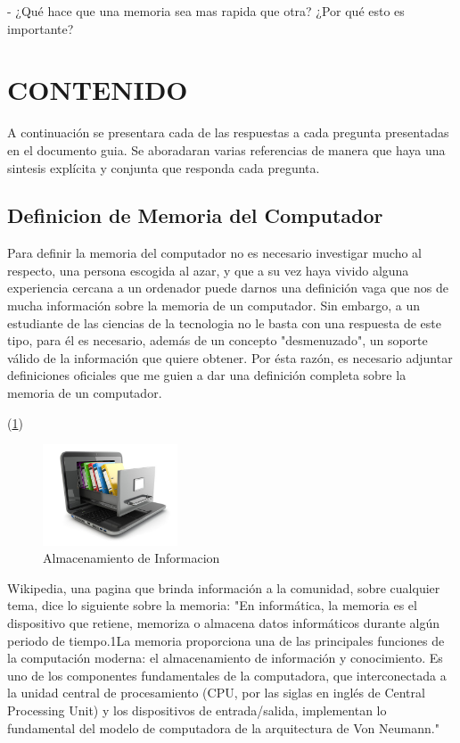 \documentclass{article}
\begin{document}
- ¿Qué hace que una memoria sea mas rapida que otra? ¿Por qué esto es importante?

\section{CONTENIDO} \label{contenido}
A continuación se presentara cada de las respuestas a cada pregunta presentadas en el documento guia.\cite{referencia}
Se aboradaran varias referencias de manera que haya una sintesis explícita y conjunta que responda cada pregunta.

\subsection{Definicion de Memoria del Computador}\label{pregunta1}
Para definir la memoria del computador no es necesario investigar mucho al respecto, una persona escogida al azar, y que a su vez haya vivido alguna experiencia cercana a un ordenador puede darnos una definición vaga que nos de mucha información sobre la memoria de un computador. Sin embargo, a un estudiante de las ciencias de la tecnologia no le basta con una respuesta de este tipo, para él es necesario, además de un concepto "desmenuzado", un soporte válido de la información que quiere obtener. Por ésta razón, es necesario adjuntar definiciones oficiales que me guien a dar una definición completa sobre la memoria de un computador.

(\ref{fig:almacenar})

\begin{figure}[h]
\includegraphics[width=4cm]{almacenar-informacion.jpg}
\centering
\caption{Almacenamiento de Informacion}
\label{fig:almacenar}
\end{figure}

Wikipedia, una pagina que brinda información a la comunidad, sobre cualquier tema, dice lo siguiente sobre la memoria:
"En informática, la memoria es el dispositivo que retiene, memoriza o almacena datos informáticos durante algún periodo de tiempo.1​La memoria proporciona una de las principales funciones de la computación moderna: el almacenamiento de información y conocimiento. Es uno de los componentes fundamentales de la computadora, que interconectada a la unidad central de procesamiento (CPU, por las siglas en inglés de Central Processing Unit) y los dispositivos de entrada/salida, implementan lo fundamental del modelo de computadora de la arquitectura de Von Neumann."\cite{wikipedia}
\end{document}
